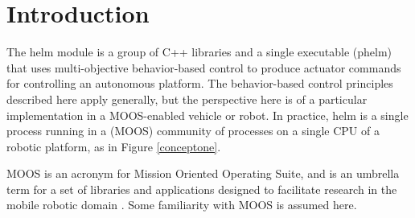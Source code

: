 \section{Introduction}
\label{intro}

The helm module is a group of C++ libraries and a single executable
(phelm) that uses multi-objective behavior-based control to produce
actuator commands for controlling an autonomous platform. The
behavior-based control principles described here apply generally, but
the perspective here is of a particular implementation in a
MOOS-enabled vehicle or robot. In practice, helm is a single
process running in a (MOOS) community of processes on a single CPU of
a robotic platform, as in Figure \ref{conceptone}.

\smallskip


MOOS is an acronym for Mission Oriented Operating Suite, and is an
umbrella term for a set of libraries and applications designed to
facilitate research in the mobile robotic domain \cite{new03}. Some
familiarity with MOOS is assumed here. 

%
%
%


